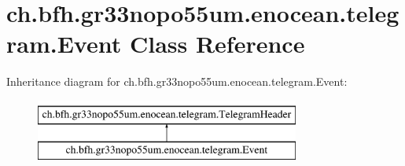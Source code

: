 \hypertarget{classch_1_1bfh_1_1gr33nopo55um_1_1enocean_1_1telegram_1_1_event}{}\section{ch.\+bfh.\+gr33nopo55um.\+enocean.\+telegram.\+Event Class Reference}
\label{classch_1_1bfh_1_1gr33nopo55um_1_1enocean_1_1telegram_1_1_event}
Inheritance diagram for ch.\+bfh.\+gr33nopo55um.\+enocean.\+telegram.\+Event\+:\begin{figure}[H]
\begin{center}
\leavevmode
\includegraphics[height=2.000000cm]{classch_1_1bfh_1_1gr33nopo55um_1_1enocean_1_1telegram_1_1_event}
\end{center}
\end{figure}
